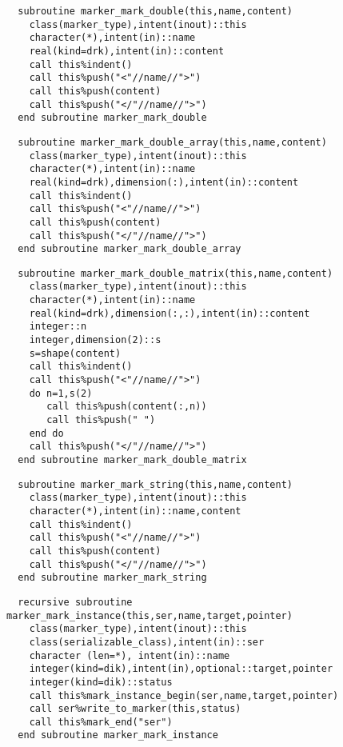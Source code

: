 \begin{Verbatim}
  subroutine marker_mark_double(this,name,content)
    class(marker_type),intent(inout)::this
    character(*),intent(in)::name
    real(kind=drk),intent(in)::content
    call this%indent()
    call this%push("<"//name//">")
    call this%push(content)
    call this%push("</"//name//">")
  end subroutine marker_mark_double
\end{Verbatim}

\begin{Verbatim}
  subroutine marker_mark_double_array(this,name,content)
    class(marker_type),intent(inout)::this
    character(*),intent(in)::name
    real(kind=drk),dimension(:),intent(in)::content
    call this%indent()
    call this%push("<"//name//">")
    call this%push(content)
    call this%push("</"//name//">")
  end subroutine marker_mark_double_array
\end{Verbatim}

\begin{Verbatim}
  subroutine marker_mark_double_matrix(this,name,content)
    class(marker_type),intent(inout)::this
    character(*),intent(in)::name
    real(kind=drk),dimension(:,:),intent(in)::content
    integer::n
    integer,dimension(2)::s
    s=shape(content)
    call this%indent()
    call this%push("<"//name//">")
    do n=1,s(2)
       call this%push(content(:,n))
       call this%push(" ")
    end do
    call this%push("</"//name//">")
  end subroutine marker_mark_double_matrix
\end{Verbatim}

\begin{Verbatim}
  subroutine marker_mark_string(this,name,content)
    class(marker_type),intent(inout)::this
    character(*),intent(in)::name,content
    call this%indent()
    call this%push("<"//name//">")
    call this%push(content)
    call this%push("</"//name//">")
  end subroutine marker_mark_string
\end{Verbatim}

\begin{Verbatim}
  recursive subroutine marker_mark_instance(this,ser,name,target,pointer)
    class(marker_type),intent(inout)::this
    class(serializable_class),intent(in)::ser
    character (len=*), intent(in)::name
    integer(kind=dik),intent(in),optional::target,pointer
    integer(kind=dik)::status
    call this%mark_instance_begin(ser,name,target,pointer)
    call ser%write_to_marker(this,status)
    call this%mark_end("ser")
  end subroutine marker_mark_instance
\end{Verbatim}

